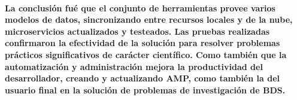 \paragraph{
    La conclusión fué que el conjunto de herramientas provee varios modelos de datos,
    sincronizando entre recursos locales y de la nube, microservicios actualizados y testeados.
    Las pruebas realizadas confirmaron la efectividad de la solución para resolver
    problemas prácticos significativos de carácter científico. Como también que la automatización y administración
    mejora la productividad del desarrollador, creando y actualizando AMP, como también la del usuario final en la
    solución de problemas de investigación de BDS.
}

